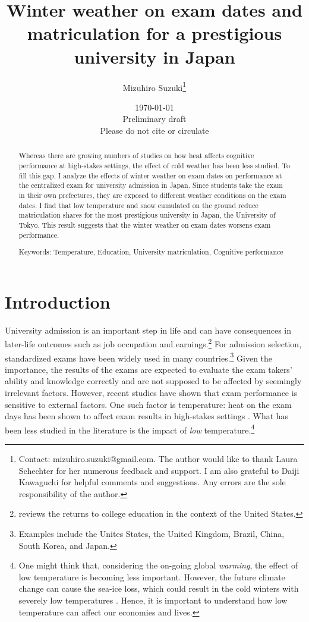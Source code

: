 \documentclass[12pt,letterpaper]{article}
\title{Winter weather on exam dates and matriculation for a prestigious university in Japan}
\author{
  Mizuhiro Suzuki\thanks{
    Contact: mizuhiro.suzuki@gmail.com.
    The author would like to thank Laura Schechter for her numerous feedback and support.
    I am also grateful to Daiji Kawaguchi for helpful comments and suggestions.
    Any errors are the sole responsibility of the author.
  }
}
\date{\today \\ \vspace{1cm} Preliminary draft \\ Please do not cite or circulate}
\begin{document}
  
\maketitle
\begin{abstract}
  \singlespacing
    \noindent 
    Whereas there are growing numbers of studies on how heat affects cognitive performance at high-stakes settings, the effect of cold weather has been less studied.
    To fill this gap, I analyze the effects of winter weather on exam dates on performance at the centralized exam for university admission in Japan.
    Since students take the exam in their own prefectures, they are exposed to different weather conditions on the exam dates. 
    I find that low temperature and snow cumulated on the ground reduce matriculation shares for the most prestigious university in Japan, the University of Tokyo.
    This result suggests that the winter weather on exam dates worsens exam performance. 

  \medskip
  \vspace{1cm}
  \noindent Keywords: Temperature, Education, University matriculation, Cognitive performance
\end{abstract}

\newpage

\section{Introduction}

University admission is an important step in life and can have consequences in later-life outcomes such as job occupation and earnings.\footnote{
  \citet{Hout2012} reviews the returns to college education in the context of the United States.
}
For admission selection, standardized exams have been widely used in many countries.\footnote{
  Examples include the Unites States, the United Kingdom, Brazil, China, South Korea, and Japan.
}
Given the importance, the results of the exams are expected to evaluate the exam takers' ability and knowledge correctly and are not supposed to be affected by seemingly irrelevant factors.
However, recent studies have shown that exam performance is sensitive to external factors.
One such factor is temperature:
heat on the exam days has been shown to affect exam results in high-stakes settings \citep{Park2020a, GraffZivin2020}.
What has been less studied in the literature is the impact of \textit{low} temperature.\footnote{
  One might think that, considering the on-going global \textit{warming}, the effect of low temperature is becoming less important.
  However, the future climate change can cause the sea-ice loss, which could result in the cold winters with severely low temperatures \citep{Kretschmer2016, Kim2014}.
  Hence, it is important to understand how low temperature can affect our economies and lives.
}
\end{document}
